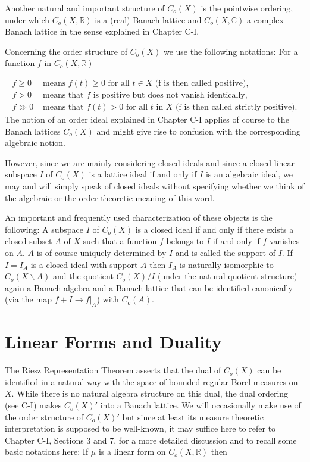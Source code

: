 Another natural and important structure of $C_{o}(X)$ is the pointwise ordering, under which $C_{o}(X,\mathbb{R})$ is a (real) Banach lattice and $C_{o}(X,\mathbb{C})$ a complex Banach lattice in the sense explained in Chapter C-I.

Concerning the order structure of $C_{o}(X)$ we use the following notations: For a function $f$ in $C_{o}(X,\mathbb{R})$

\[
\begin{aligned}
	f \geq 0 &\text{ means } f(t) \geq 0 \text{ for all } t \in X \text{ (f is 			             then called positive)}, \\
	f > 0 &\text{ means that } f \text{ is positive but does not vanish identically}, \\
	f \gg 0 &\text{ means that } f(t) > 0 \text{ for all } t \text{ in } X \text{ (f is then called strictly positive)}.
\end{aligned}
\]
The notion of an order ideal explained in Chapter C-I applies of course to the Banach lattices $C_{o}(X)$ and might give rise to confusion with the corresponding algebraic notion.

However, since we are mainly considering closed ideals and since a closed linear subspace $I$ of $C_{o}(X)$ is a lattice ideal if and only if $I$ is an algebraic ideal, we may and will simply speak of closed ideals without specifying whether we think of the algebraic or the order theoretic meaning of this word.

An important and frequently used characterization of these objects is the following: A subspace $I$ of $C_{o}(X)$ is a closed ideal if and only if there exists a closed subset $A$ of $X$ such that a function $f$ belongs to $I$ if and only if $f$ vanishes on $A$.
$A$ is of course uniquely determined by $I$ and is called the support of $I$.
If $I = I_{A}$ is a closed ideal with support $A$ then $I_{A}$ is naturally isomorphic to $C_{o}(X\backslash A)$ and the quotient $C_{o}(X)/I$ (under the natural quotient structure) again a Banach algebra and a Banach lattice that can be identified canonically (via the map $f + I \to f|_{A}$) with $C_{o}(A)$.

\section{Linear Forms and Duality}\label{sec:b1-2}

The Riesz Representation Theorem asserts that the dual of $C_{o}(X)$ can be identified in a natural way with the space of bounded regular Borel measures on $X$.
While there is no natural algebra structure on this dual, the dual ordering (see C-I) makes $C_{o}(X)'$ into a Banach lattice.
We will occasionally make use of the order structure of $C_{o}(X)'$ but since at least its measure theoretic interpretation is supposed to be well-known, it may suffice here to refer to Chapter C-I, Sections 3 and 7, for a more detailed discussion and to recall some basic notations here: If $\mu$ is a linear form on $C_{o}(X,\mathbb{R})$ then

